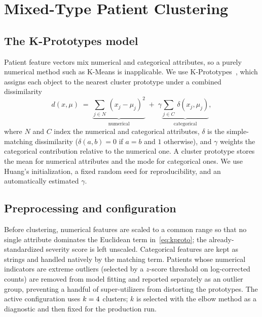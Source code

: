 \section{Mixed-Type Patient Clustering}\label{sec:clustering}

\subsection{The K-Prototypes model}
Patient feature vectors mix numerical and categorical attributes, so a
purely numerical method such as K-Means is inapplicable. We use
K-Prototypes~\cite{Huang1998KPrototypes}, which assigns each object to the
nearest cluster prototype under a combined dissimilarity
\begin{equation}
  d(x,\mu) \;=\; \underbrace{\sum_{j\in N}\,(x_j-\mu_j)^2}_{\text{numerical}}
  \;+\; \gamma \underbrace{\sum_{j\in C}\,\delta(x_j,\mu_j)}_{\text{categorical}},
  \label{eq:kproto}
\end{equation}
where $N$ and $C$ index the numerical and categorical attributes, $\delta$ is
the simple-matching dissimilarity ($\delta(a,b)=0$ if $a=b$ and $1$ otherwise),
and $\gamma$ weights the categorical contribution relative to the numerical one.
A cluster prototype stores the mean for numerical attributes and the mode for
categorical ones. We use Huang's initialization, a fixed random seed for
reproducibility, and an automatically estimated $\gamma$.

\subsection{Preprocessing and configuration}
Before clustering, numerical features are scaled to a common range so that no
single attribute dominates the Euclidean term in~\eqref{eq:kproto}; the
already-standardized severity score is left unscaled. Categorical features are
kept as strings and handled natively by the matching term. Patients whose
numerical indicators are extreme outliers (selected by a $z$-score threshold on
log-corrected counts) are removed from model fitting and reported separately as
an outlier group, preventing a handful of super-utilizers from distorting the
prototypes. The active configuration uses $k=4$ clusters; $k$ is
selected with the elbow method as a diagnostic and then fixed for the production
run.

